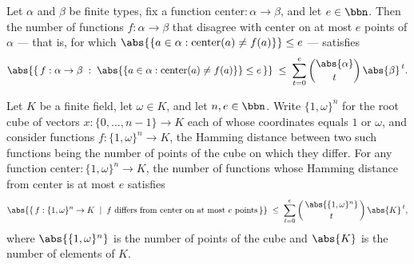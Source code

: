 \begin{theorem}
\label{RazborovSmolensky.function_hammingBall_card_le_binomial}
\leanok
{}
Let $\alpha$ and $\beta$ be finite types, fix a function $\mathrm{center} : \alpha \to
\beta$, and let $e \in \bbn$. Then the number of functions $f : \alpha \to \beta$ that
disagree with $\mathrm{center}$ on at most $e$ points of $\alpha$ — that is, for which
$\abs{\{a \in \alpha : \mathrm{center}(a) \ne f(a)\}} \le e$ — satisfies
\[
\abs{\{\, f : \alpha \to \beta \;:\; \abs{\{a \in \alpha : \mathrm{center}(a) \ne
f(a)\}} \le e \,\}} \;\le\; \sum_{t=0}^{e} \binom{\abs{\alpha}}{t}\,\abs{\beta}^{\,t}.
\]
\end{theorem}

\begin{theorem}
\label{RazborovSmolensky.rootCubeBall_card_le_binomial}
\leanok
{}
Let $K$ be a finite field, let $\omega \in K$, and let $n, e \in \bbn$. Write
$\{1,\omega\}^n$ for the root cube of vectors $x : \{0,\dots,n-1\} \to K$ each of whose
coordinates equals $1$ or $\omega$, and consider functions $f : \{1,\omega\}^n \to K$,
the Hamming distance between two such functions being the number of points of the cube
on which they differ. For any function $\mathrm{center} : \{1,\omega\}^n \to K$, the
number of functions whose Hamming distance from $\mathrm{center}$ is at most $e$
satisfies
\[
\abs{\{\, f : \{1,\omega\}^n \to K \;\mid\; f \text{ differs from } \mathrm{center}
\text{ on at most } e \text{ points}\,\}}
  \;\le\; \sum_{t=0}^{e} \binom{\,\abs{\{1,\omega\}^n}\,}{t}\,\abs{K}^{\,t},
\]
where $\abs{\{1,\omega\}^n}$ is the number of points of the cube and $\abs{K}$ is the
number of elements of $K$.
\end{theorem}

